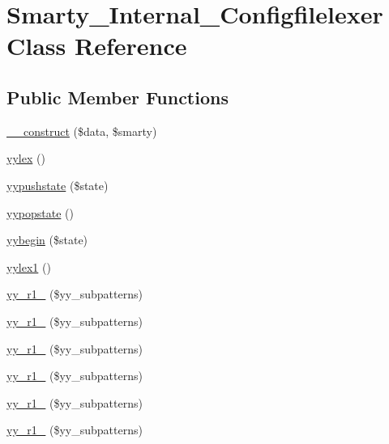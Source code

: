 \hypertarget{class_smarty___internal___configfilelexer}{}\section{Smarty\+\_\+\+Internal\+\_\+\+Configfilelexer Class Reference}
\label{class_smarty___internal___configfilelexer}
\subsection*{Public Member Functions}
\begin{DoxyCompactItemize}
\item 
\hyperlink{class_smarty___internal___configfilelexer_a443223ecf98d1aa0af5bb8d1358537c2}{\+\_\+\+\_\+construct} (\$data, \$smarty)
\item 
\hyperlink{class_smarty___internal___configfilelexer_a309773bdd56fc4ec055dac74de293720}{yylex} ()
\item 
\hyperlink{class_smarty___internal___configfilelexer_a3f589601a8607062bb1b2c467e29d4a0}{yypushstate} (\$state)
\item 
\hyperlink{class_smarty___internal___configfilelexer_a83163db45dd2973f2ecaf43fdf13d769}{yypopstate} ()
\item 
\hyperlink{class_smarty___internal___configfilelexer_a05802d06c22e5606d359fac44761518e}{yybegin} (\$state)
\item 
\hyperlink{class_smarty___internal___configfilelexer_a31f6b47c2d186d3c9a744331907edaec}{yylex1} ()
\item 
\hyperlink{class_smarty___internal___configfilelexer_a57272ad98ad178dc2bdd2b151e41f774}{yy\+\_\+r1\+\_} (\$yy\+\_\+subpatterns)
\item 
\hyperlink{class_smarty___internal___configfilelexer_a8870a63a8d9bea3a566fc0855eddb53e}{yy\+\_\+r1\+\_} (\$yy\+\_\+subpatterns)
\item 
\hyperlink{class_smarty___internal___configfilelexer_a1e63864c06e0030cff00183953f1ce49}{yy\+\_\+r1\+\_} (\$yy\+\_\+subpatterns)
\item 
\hyperlink{class_smarty___internal___configfilelexer_ad818470371dea80e3b00781620583870}{yy\+\_\+r1\+\_} (\$yy\+\_\+subpatterns)
\item 
\hyperlink{class_smarty___internal___configfilelexer_adc85748c3f8e8384d5a9d1732d5a02e1}{yy\+\_\+r1\+\_} (\$yy\+\_\+subpatterns)
\item 
\hyperlink{class_smarty___internal___configfilelexer_a88a2715c9566987f9945142946dba9b6}{yy\+\_\+r1\+\_} (\$yy\+\_\+subpatterns)

\end{DoxyCompactItemize}
